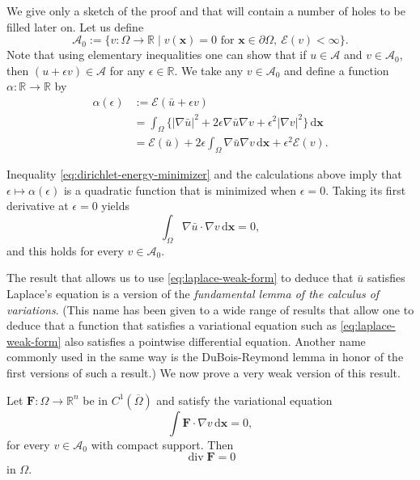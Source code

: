 \begin{Proof}We give only a sketch of the proof and that will contain a number of holes to be filled later on. Let us define
\begin{equation}\label{eq:zero-boundary-admissible-class}
\mathcal{A}_0:=\{v:\Omega\to\mathbb{R}\mid v(\bm{x})=0\text{ for }\bm{x}\in\partial\Omega,\ \mathcal{E}(v)<\infty\}.
\end{equation}
Note that using elementary inequalities one can show that if $u\in\mathcal{A}$ and $v\in\mathcal{A}_0$, then $(u+\epsilon v)\in\mathcal{A}$ for any $\epsilon\in\mathbb{R}$. We take any $v\in\mathcal{A}_0$ and define a function $\alpha:\mathbb{R}\to\mathbb{R}$ by
\begin{equation}\label{eq:dirichlet-energy-variation}
\begin{aligned}
\alpha(\epsilon)&:=\mathcal{E}(\bar u+\epsilon v)\\
&=\int_\Omega\{|\nabla\bar u|^2+2\epsilon\nabla\bar u\nabla v+\epsilon^2|\nabla v|^2\}\,\mathrm{d}\bm{x}\\
&=\mathcal{E}(\bar u)+2\epsilon\int_\Omega\nabla\bar u\nabla v\,\mathrm{d}\bm{x}+\epsilon^2\mathcal{E}(v).
\end{aligned}
\end{equation}


Inequality \eqref{eq:dirichlet-energy-minimizer} and the calculations above imply that $\epsilon\mapsto\alpha(\epsilon)$ is a quadratic function that is minimized when $\epsilon=0$. Taking its first derivative at $\epsilon=0$ yields
\begin{equation}\label{eq:laplace-weak-form}
\int_\Omega\nabla\bar u\cdot\nabla v\,\mathrm{d}\bm{x}=0,
\end{equation}
and this holds for every $v\in\mathcal{A}_0$.

The result that allows us to use \eqref{eq:laplace-weak-form} to deduce that $\bar u$ satisfies Laplace's equation is a version of the \emph{fundamental lemma of the calculus of variations}. (This name has been given to a wide range of results that allow one to deduce that a function that satisfies a variational equation such as \eqref{eq:laplace-weak-form} also satisfies a pointwise differential equation. Another name commonly used in the same way is the DuBois-Reymond lemma in honor of the first versions of such a result.) We now prove a very weak version of this result.

\begin{Lemma}
\label{lem:variational-divergence}
Let $\bm{F}:\Omega\to\mathbb{R}^n$ be in $C^1(\overline\Omega)$ and satisfy the variational equation
\begin{equation}\label{eq:variational-divergence-identity}
\int\bm{F}\cdot\nabla v\,\mathrm{d}\bm{x}=0,
\end{equation}
for every $v\in\mathcal{A}_0$ with compact support. Then
\begin{equation}\label{eq:variational-divergence-zero}
\operatorname{div}\bm{F}=0
\end{equation}
in $\Omega$.
\end{Lemma}


\end{Proof}
